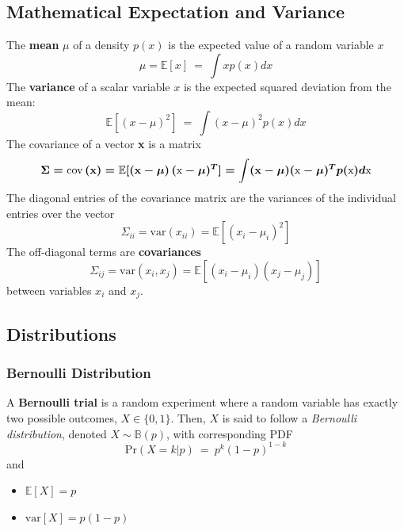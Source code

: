 \documentclass[11pt]{article}
\theoremstyle{plain}
\theoremstyle{definition}
\begin{document}
\subsection{Mathematical Expectation and Variance}
The \textbf{mean} $\mu$ of a density $p(x)$ is the expected value of a random variable $x$
\begin{equation}
\mu= \mathbb{E}[x] \ = \ \int x p(x) dx
\end{equation}
The \textbf{variance} of a scalar variable $x$ is the expected squared deviation from the mean:
\begin{equation}
\mathbb{E}[(x-\mu)^2] \ = \ \int (x-\mu)^2 p(x) dx
\end{equation}
The covariance of a vector \textbf{x} is a matrix
\begin{equation}
\Sigma = \text{cov}\left(\textbf{x}\right) = \mathbb{E}[\left(\textbf{x}-\boldmath{\mu}\right)(\text{x}-\boldmath{\mu})^T] = \int (\textbf{x}-\boldmath{\mu})(\text{x}-\boldmath{\mu})^T p(\text{x}) d\text{x}
\end{equation}
The diagonal entries of the covariance matrix are the variances of the individual entries over the vector
\begin{equation}
\Sigma_{ii} = \text{var}(x_{ii}) = \mathbb{E}[(x_i-\mu_i)^2]
\end{equation}
The off-diagonal terms are \textbf{covariances}
\begin{equation}
\Sigma_{ij} = \text{var}(x_{i},x_{j}) = \mathbb{E}[(x_i-\mu_i)(x_j-\mu_j)]
\end{equation}
between variables $x_i$ and $x_j$.

\subsection{Distributions}

\subsubsection{Bernoulli Distribution}
A \textbf{Bernoulli trial} is a random experiment where a random variable has exactly two possible outcomes, $X \in \{0,1\}$. Then, $X$ is said to follow a \textit{Bernoulli distribution}, denoted $X \sim \mathbb{B}(p)$,  with corresponding PDF
\begin{equation}
\text{Pr}(X=k|p) \ = \ p^k(1-p)^{1-k}
\end{equation}
and
\begin{itemize}
	\item $\mathbb{E}[X] = p$
	\item $\text{var}[X] = p(1-p)$
\end{itemize}
\end{document}
